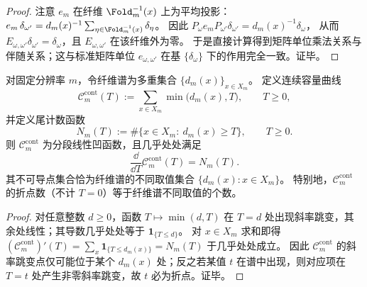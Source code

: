 \begin{proof}
注意 \(e_m\) 在纤维 \(\Fold_m^{-1}(x)\) 上为平均投影：
\(
e_m\,\delta_{\omega'}=d_m(x)^{-1}\sum_{\eta\in\Fold_m^{-1}(x)}\delta_\eta
\)。
因此
\(
P_\omega e_m P_{\omega'}\delta_{\omega'}
=d_m(x)^{-1}\delta_\omega
\)，
从而 \(E_{\omega,\omega'}\delta_{\omega'}=\delta_\omega\)，且 \(E_{\omega,\omega'}\) 在该纤维外为零。
于是直接计算得到矩阵单位乘法关系与伴随关系；这与标准矩阵单位 \(e_{\omega,\omega'}\) 在基 \(\{\delta_\omega\}\) 下的作用完全一致。证毕。
\end{proof}

\begin{proposition}[容量曲线的折点与纤维谱的层数]\label{prop:op-algebra-capacity-kinks-equal-spectrum-levels}
对固定分辨率 \(m\)，令纤维谱为多重集合 \(\{d_m(x)\}_{x\in X_m}\)。
定义连续容量曲线
\[
\mathcal C_m^{\mathrm{cont}}(T):=\sum_{x\in X_m}\min\bigl(d_m(x),T\bigr),\qquad T\ge 0,
\]
并定义尾计数函数
\[
N_m(T):=\#\{x\in X_m:\ d_m(x)\ge T\},\qquad T\ge 0.
\]
则 \(\mathcal C_m^{\mathrm{cont}}\) 为分段线性凹函数，且几乎处处满足
\[
\frac{\dd}{\dd T}\mathcal C_m^{\mathrm{cont}}(T)=N_m(T).
\]
其不可导点集合恰为纤维谱的不同取值集合 \(\{d_m(x):x\in X_m\}\)。
特别地，\(\mathcal C_m^{\mathrm{cont}}\) 的折点数（不计 \(T=0\)）等于纤维谱不同取值的个数。
\end{proposition}
\begin{proof}
对任意整数 \(d\ge 0\)，函数 \(T\mapsto \min(d,T)\) 在 \(T=d\) 处出现斜率跳变，其余处线性；其导数几乎处处等于 \(\mathbf 1_{\{T\le d\}}\)。
对 \(x\in X_m\) 求和即得 \((\mathcal C_m^{\mathrm{cont}})'(T)=\sum_x \mathbf 1_{\{T\le d_m(x)\}}=N_m(T)\) 于几乎处处成立。
因此 \(\mathcal C_m^{\mathrm{cont}}\) 的斜率跳变点仅可能位于某个 \(d_m(x)\) 处；反之若某值 \(t\) 在谱中出现，则对应项在 \(T=t\) 处产生非零斜率跳变，故 \(t\) 必为折点。证毕。
\end{proof}

